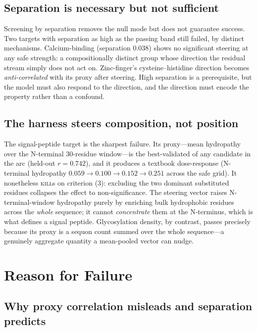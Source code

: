 \documentclass{article}
\begin{document}
\subsection{Separation is necessary but not sufficient}

Screening by separation removes the null mode but does not guarantee success.
Two targets with separation as high as the passing band still failed, by
distinct mechanisms. Calcium-binding (separation $0.038$) shows no significant
steering at any safe strength: a compositionally distinct group whose direction
the residual stream simply does not act on. Zinc-finger's cysteine--histidine
direction becomes \emph{anti-correlated} with its proxy after steering. High
separation is a prerequisite, but the model must also respond to the direction,
and the direction must encode the property rather than a confound.

\subsection{The harness steers composition, not position}

The signal-peptide target is the sharpest failure. Its proxy---mean hydropathy
over the N-terminal 30-residue window---is the best-validated of any candidate
in the arc (held-out $r=0.742$), and it produces a textbook dose-response
(N-terminal hydropathy $0.059\!\rightarrow\!0.100\!\rightarrow\!0.152
\!\rightarrow\!0.251$ across the safe grid). It nonetheless
\textsc{kill}s on criterion (3): excluding the two dominant substituted
residues collapses the effect to non-significance. The steering vector raises
N-terminal-window hydropathy purely by enriching bulk hydrophobic residues
across the \emph{whole} sequence; it cannot \emph{concentrate} them at the
N-terminus, which is what defines a signal peptide. Glycosylation density, by
contrast, passes precisely because its proxy is a sequon count summed over the
whole sequence---a genuinely aggregate quantity a mean-pooled vector can nudge.

\section{Reason for Failure}
\label{sec:failure}

\subsection{Why proxy correlation misleads and separation predicts}
\end{document}
